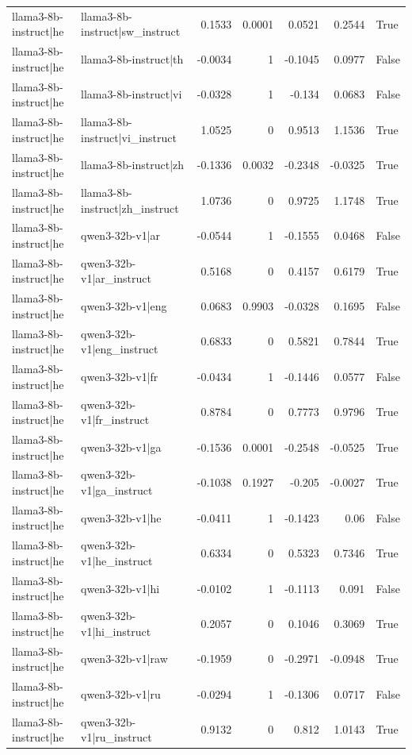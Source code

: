 \begin{table}
\begin{tabular}{l l r r r r l}
llama3-8b-instruct|he & llama3-8b-instruct|sw_instruct & 0.1533 & 0.0001 & 0.0521 & 0.2544 & True \\
llama3-8b-instruct|he & llama3-8b-instruct|th & -0.0034 & 1 & -0.1045 & 0.0977 & False \\
llama3-8b-instruct|he & llama3-8b-instruct|vi & -0.0328 & 1 & -0.134 & 0.0683 & False \\
llama3-8b-instruct|he & llama3-8b-instruct|vi_instruct & 1.0525 & 0 & 0.9513 & 1.1536 & True \\
llama3-8b-instruct|he & llama3-8b-instruct|zh & -0.1336 & 0.0032 & -0.2348 & -0.0325 & True \\
llama3-8b-instruct|he & llama3-8b-instruct|zh_instruct & 1.0736 & 0 & 0.9725 & 1.1748 & True \\
llama3-8b-instruct|he & qwen3-32b-v1|ar & -0.0544 & 1 & -0.1555 & 0.0468 & False \\
llama3-8b-instruct|he & qwen3-32b-v1|ar_instruct & 0.5168 & 0 & 0.4157 & 0.6179 & True \\
llama3-8b-instruct|he & qwen3-32b-v1|eng & 0.0683 & 0.9903 & -0.0328 & 0.1695 & False \\
llama3-8b-instruct|he & qwen3-32b-v1|eng_instruct & 0.6833 & 0 & 0.5821 & 0.7844 & True \\
llama3-8b-instruct|he & qwen3-32b-v1|fr & -0.0434 & 1 & -0.1446 & 0.0577 & False \\
llama3-8b-instruct|he & qwen3-32b-v1|fr_instruct & 0.8784 & 0 & 0.7773 & 0.9796 & True \\
llama3-8b-instruct|he & qwen3-32b-v1|ga & -0.1536 & 0.0001 & -0.2548 & -0.0525 & True \\
llama3-8b-instruct|he & qwen3-32b-v1|ga_instruct & -0.1038 & 0.1927 & -0.205 & -0.0027 & True \\
llama3-8b-instruct|he & qwen3-32b-v1|he & -0.0411 & 1 & -0.1423 & 0.06 & False \\
llama3-8b-instruct|he & qwen3-32b-v1|he_instruct & 0.6334 & 0 & 0.5323 & 0.7346 & True \\
llama3-8b-instruct|he & qwen3-32b-v1|hi & -0.0102 & 1 & -0.1113 & 0.091 & False \\
llama3-8b-instruct|he & qwen3-32b-v1|hi_instruct & 0.2057 & 0 & 0.1046 & 0.3069 & True \\
llama3-8b-instruct|he & qwen3-32b-v1|raw & -0.1959 & 0 & -0.2971 & -0.0948 & True \\
llama3-8b-instruct|he & qwen3-32b-v1|ru & -0.0294 & 1 & -0.1306 & 0.0717 & False \\
llama3-8b-instruct|he & qwen3-32b-v1|ru_instruct & 0.9132 & 0 & 0.812 & 1.0143 & True \\

\end{tabular}
\end{table}
